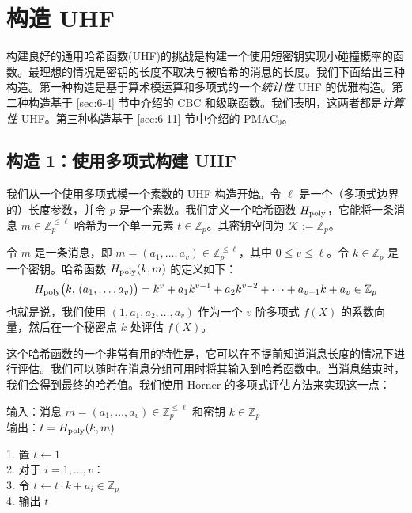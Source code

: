 \section{构造 UHF}\label{sec:7-2}

构建良好的通用哈希函数(UHF)的挑战是构建一个使用短密钥实现小碰撞概率的函数。最理想的情况是密钥的长度不取决与被哈希的消息的长度。我们下面给出三种构造。第一种构造是基于算术模运算和多项式的一个\emph{统计性} UHF 的优雅构造。第二种构造基于 \ref{sec:6-4} 节中介绍的 CBC 和级联函数。我们表明，这两者都是\emph{计算性} UHF。第三种构造基于 \ref{sec:6-11} 节中介绍的 $\mathrm{PMAC}_0$。

\subsection{构造 1：使用多项式构建 UHF}

我们从一个使用多项式模一个素数的 UHF 构造开始。令 $\ell$ 是一个（多项式边界的）长度参数，并令 $p$ 是一个素数。我们定义一个哈希函数 $H_{\rm poly}$，它能将一条消息 $m\in\mathbb{Z}^{\leq\ell}_p$ 哈希为一个单一元素 $t\in\mathbb{Z}_p$。其密钥空间为 $\mathcal{K}:=\mathbb{Z}_p$。

令 $m$ 是一条消息，即 $m=(a_1,\dots,a_v)\in\mathbb{Z}^{\leq\ell}_p$，其中 $0\leq v\leq\ell$。令 $k\in\mathbb{Z}_p$ 是一个密钥。哈希函数 $H_{\rm poly}(k,m)$ 的定义如下：
\begin{equation}\label{eq:7-3}
H_{\rm poly}\big(k,\,(a_1,\dots,a_v)\big)=k^v+a_1k^{v-1}+a_2k^{v-2}+\cdots+a_{v-1}k+a_v\in\mathbb{Z}_p
\end{equation}
也就是说，我们使用 $(1,a_1,a_2,\dots,a_v)$ 作为一个 $v$ 阶多项式 $f(X)$ 的系数向量，然后在一个秘密点 $k$ 处评估 $f(X)$。

这个哈希函数的一个非常有用的特性是，它可以在不提前知道消息长度的情况下进行评估。我们可以随时在消息分组可用时将其输入到哈希函数中。当消息结束时，我们会得到最终的哈希值。我们使用 Horner 的多项式评估方法来实现这一点：

\vspace{5pt}

\hspace*{5pt} 输入：消息 $m=(a_1,\dots,a_v)\in\mathbb{Z}^{\leq\ell}_p$ 和密钥 $k\in\mathbb{Z}_p$\\
\hspace*{26pt} 输出：$t=H_{\rm poly}(k,m)$

\vspace{5pt}

\hspace*{5pt} 1. \quad 置 $t\leftarrow1$\\
\hspace*{26pt} 2. \quad 对于 $i=1,\dots,v$：\\
\hspace*{26pt} 3. \quad\quad\quad 令 $t\leftarrow t\cdot k+a_i\in\mathbb{Z}_p$\\
\hspace*{26pt} 4. \quad 输出 $t$

